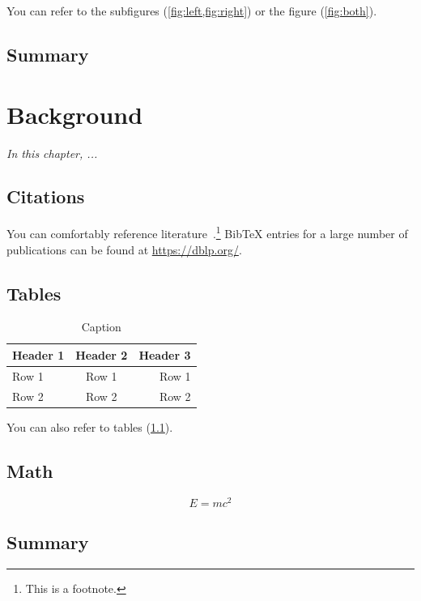 \documentclass[
	12pt,
	a4paper,
	abstract,
	bibliography=totoc,
	chapterprefix,
	numbers=endperiod,
	parskip=half,
]{scrreprt}
\begin{document}
You can refer to the subfigures (\cref{fig:left,fig:right}) or the figure (\cref{fig:both}).

\section*{Summary}

\lipsum[2]

\chapter{Background}
\label{cha:background}

\textit{In this chapter, ...}

\section{Citations}

You can comfortably reference literature~\cite{DBLP:journals/superfri/DuweLMSF0B020}.\footnote{This is a footnote.}
BibTeX entries for a large number of publications can be found at \url{https://dblp.org/}.

\section{Tables}

\begin{table}[ht]
	\centering
	\begin{tabular}{|l|c|r|}
		\hline
		\textbf{Header 1} & \textbf{Header 2} & \textbf{Header 3} \\
		\hline
		\hline
		Row 1 & Row 1 & Row 1 \\
		Row 2 & Row 2 & Row 2 \\
		\hline
	\end{tabular}
	\caption{Caption}
	\label{tab:table}
\end{table}

You can also refer to tables (\cref{tab:table}).

\section{Math}

\[
	E = m c^2
\]

\section*{Summary}

\lipsum[2]
\end{document}
